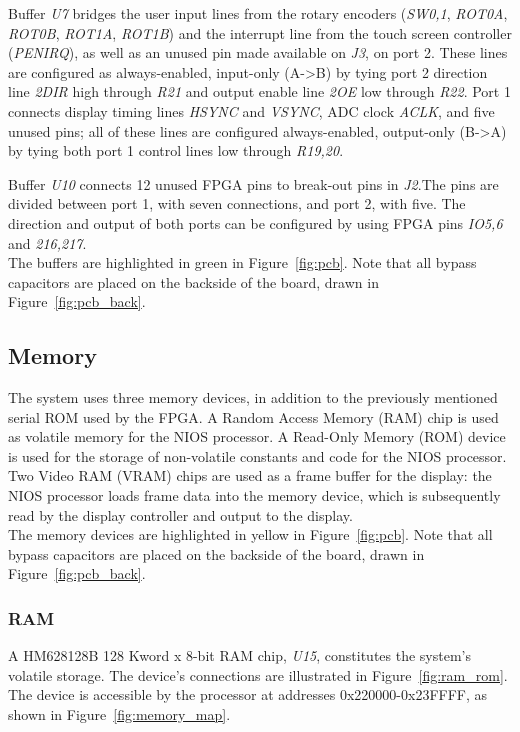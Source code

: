 \documentclass[titlepage]{scrartcl}
\begin{document}
	Buffer \textit{U7} bridges the user input lines from the rotary encoders (\textit{SW0,1}, \textit{ROT0A}, \textit{ROT0B}, \textit{ROT1A}, \textit{ROT1B}) and the interrupt line from the touch screen controller (\textit{PENIRQ}), as well as an unused pin made available on \textit{J3}, on port 2. These lines are configured as always-enabled, input-only (A->B) by tying port 2 direction line \textit{2DIR} high through \textit{R21} and output enable line \textit{2OE} low through \textit{R22}. Port 1 connects display timing lines \textit{HSYNC} and \textit{VSYNC}, ADC clock \textit{ACLK}, and five unused pins; all of these lines are configured always-enabled, output-only (B->A) by tying both port 1 control lines low through \textit{R19,20}.

	Buffer \textit{U10} connects 12 unused FPGA pins to break-out pins in \textit{J2}.The pins are divided between port 1, with seven connections, and port 2, with five. The direction and output of both ports can be configured by using FPGA pins \textit{IO5,6} and \textit{216,217}.\\

	The buffers are highlighted in green in Figure~\ref{fig:pcb}. Note that all bypass capacitors are placed on the backside of the board, drawn in Figure~\ref{fig:pcb_back}.\\

	\clearpage

	\subsection{Memory}
	The system uses three memory devices, in addition to the previously mentioned serial ROM used by the FPGA. A Random Access Memory (RAM) chip is used as volatile memory for the NIOS processor. A Read-Only Memory (ROM) device is used for the storage of non-volatile constants and code for the NIOS processor. Two Video RAM (VRAM) chips are used as a frame buffer for the display: the NIOS processor loads frame data into the memory device, which is subsequently read by the display controller and output to the display.\\

	The memory devices are highlighted in yellow in Figure~\ref{fig:pcb}. Note that all bypass capacitors are placed on the backside of the board, drawn in Figure~\ref{fig:pcb_back}.\\
	
	\subsubsection{RAM \label{sec:ram}}
	A HM628128B 128 Kword x 8-bit RAM chip, \textit{U15}, constitutes the system's volatile storage. The device's connections are illustrated in Figure~\ref{fig:ram_rom}. The device is accessible by the processor at addresses 0x220000-0x23FFFF, as shown in Figure~\ref{fig:memory_map}.\\
\end{document}
